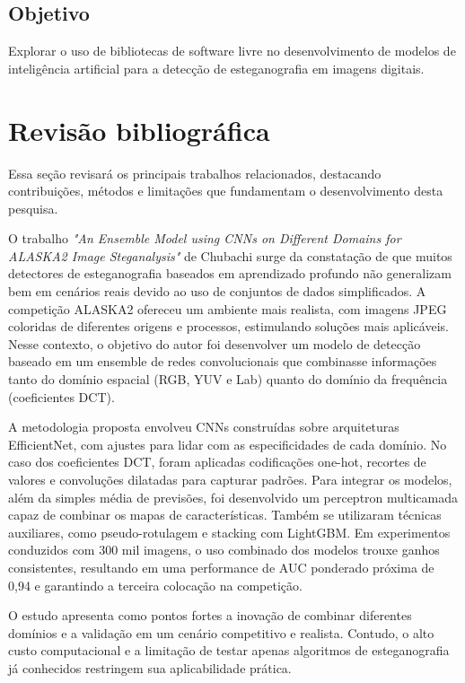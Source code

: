 \documentclass[12pt]{article}
\begin{document}
\subsection{Objetivo}

Explorar o uso de bibliotecas de software livre no desenvolvimento de modelos
de inteligência artificial para a detecção de esteganografia em imagens
digitais.

\section{Revisão bibliográfica} \label{sec:firstpage}
Essa seção revisará os principais trabalhos relacionados, destacando
contribuições, métodos e limitações que fundamentam o desenvolvimento desta
pesquisa.


O trabalho \textit{"An Ensemble Model using CNNs on Different Domains for
  ALASKA2 Image Steganalysis"} de Chubachi \cite{chubachi2020cnn} surge da
constatação de que muitos detectores de esteganografia baseados em aprendizado
profundo não generalizam bem em cenários reais devido ao uso de conjuntos de
dados simplificados. A competição ALASKA2 ofereceu um ambiente mais realista,
com imagens JPEG coloridas de diferentes origens e processos, estimulando
soluções mais aplicáveis. Nesse contexto, o objetivo do autor foi desenvolver
um modelo de detecção baseado em um ensemble de redes convolucionais que
combinasse informações tanto do domínio espacial (RGB, YUV e Lab) quanto do
domínio da frequência (coeficientes DCT).

A metodologia proposta envolveu CNNs construídas sobre arquiteturas
EfficientNet, com ajustes para lidar com as especificidades de cada domínio. No
caso dos coeficientes DCT, foram aplicadas codificações one-hot, recortes de
valores e convoluções dilatadas para capturar padrões. Para integrar os
modelos, além da simples média de previsões, foi desenvolvido um perceptron
multicamada capaz de combinar os mapas de características. Também se utilizaram
técnicas auxiliares, como pseudo-rotulagem e stacking com LightGBM. Em
experimentos conduzidos com 300 mil imagens, o uso combinado dos modelos trouxe
ganhos consistentes, resultando em uma performance de AUC ponderado próxima de
0,94 e garantindo a terceira colocação na competição.

O estudo apresenta como pontos fortes a inovação de combinar diferentes
domínios e a validação em um cenário competitivo e realista. Contudo, o alto
custo computacional e a limitação de testar apenas algoritmos de esteganografia
já conhecidos restringem sua aplicabilidade prática.
\end{document}
